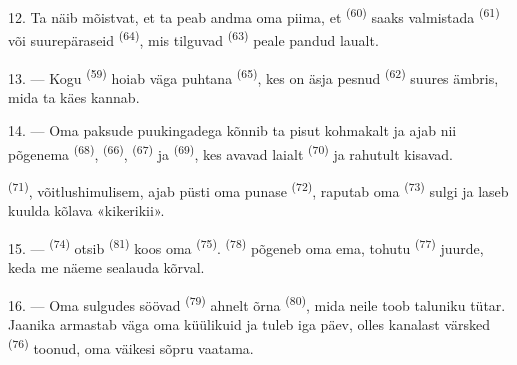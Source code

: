 12. Ta näib mõistvat, et ta peab andma oma piima, et 
\textsuperscript{(60)} saaks valmistada  
\textsuperscript{(61)} või suurepäraseid  \textsuperscript{(64)}, mis
tilguvad  \textsuperscript{(63)} peale pandud laualt.

13. --- Kogu  \textsuperscript{(59)} hoiab väga puhtana
 \textsuperscript{(65)}, kes on äsja pesnud 
\textsuperscript{(62)} suures ämbris, mida ta käes kannab.

\VUsaut{3.0mm}
\VUsaut{3.0mm}

14. --- Oma paksude puukingadega kõnnib ta pisut kohmakalt ja ajab nii põgenema
 \textsuperscript{(68)},  \textsuperscript{(66)},
 \textsuperscript{(67)} ja  \textsuperscript{(69)}, kes
avavad laialt  \textsuperscript{(70)} ja rahutult kisavad.

 \textsuperscript{(71)}, võitlushimulisem, ajab püsti oma punase
 \textsuperscript{(72)}, raputab oma  \textsuperscript{(73)}
sulgi ja laseb kuulda kõlava «kikerikii».

15. ---  \textsuperscript{(74)} otsib 
\textsuperscript{(81)} koos oma  \textsuperscript{(75)}.
 \textsuperscript{(78)} põgeneb oma ema, tohutu 
\textsuperscript{(77)} juurde, keda me näeme sealauda kõrval.

16. --- Oma sulgudes söövad  \textsuperscript{(79)} ahnelt õrna
 \textsuperscript{(80)}, mida neile toob taluniku tütar. Jaanika armastab
väga oma küülikuid ja tuleb iga päev, olles kanalast värsked 
\textsuperscript{(76)} toonud, oma väikesi sõpru vaatama.

\VUsaut{6.0mm}
\VUfilet{22mm}
